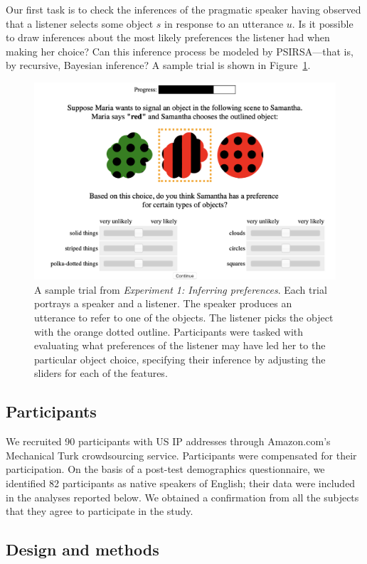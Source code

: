 \documentclass[11pt,a4paper]{article}
\begin{document}
Our first task is to check the inferences of the pragmatic speaker having observed that a listener selects some object $s$ in response to an utterance $u$. 
Is it possible to draw inferences about the most likely preferences the listener had when making her choice? 
Can this inference process be modeled by PSIRSA---that is, by recursive, Bayesian inference?
A sample trial is shown in Figure~\ref{exp1-trial}.

\begin{figure}[ht!]
	\centering
	\includegraphics[width=4.5in]{images/preference-trial.png}
	\caption{ \small{A sample trial from \emph{Experiment 1: Inferring preferences}. Each trial portrays a speaker and a listener. The speaker produces an utterance to refer to one of the objects. The listener picks the object with the orange dotted outline. Participants were tasked with evaluating what preferences of the listener may have led her to the particular object choice, specifying their inference by adjusting the sliders for each of the features}.}
	\label{exp1-trial}
\end{figure}

\subsection{Participants}

We recruited 90 participants with US IP addresses through Amazon.com's Mechanical Turk crowdsourcing service. Participants were compensated for their participation. On the basis of a post-test demographics questionnaire, we identified 82 participants as native speakers of English; their data were included in the analyses reported below. We obtained a confirmation from all the subjects that they agree to participate in the study.

\subsection{Design and methods}
\end{document}
